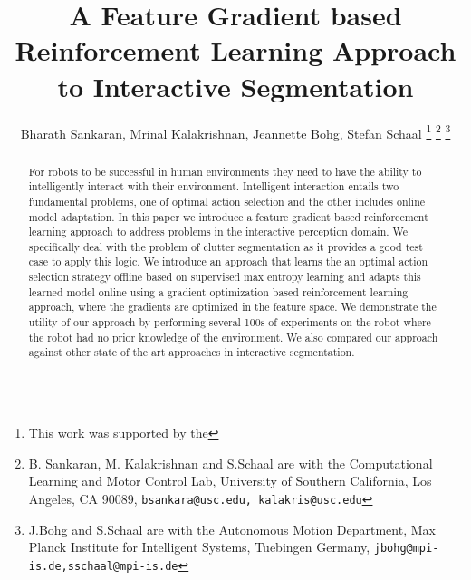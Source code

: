 \documentclass[letterpaper, 10pt, conference]{ieeeconf}
\begin{document}
\title{\LARGE \bf A Feature Gradient based Reinforcement Learning Approach to Interactive Segmentation}

\author{Bharath Sankaran, Mrinal Kalakrishnan, Jeannette Bohg, Stefan Schaal%
\thanks{This work was supported by the }%
\thanks{B. Sankaran, M. Kalakrishnan and S.Schaal are with the Computational Learning and Motor Control Lab, University of Southern California, Los Angeles, CA 90089, {\tt\small bsankara@usc.edu, kalakris@usc.edu}}%
\thanks{J.Bohg and S.Schaal are with the Autonomous Motion Department, Max Planck Institute for Intelligent Systems, Tuebingen Germany, {\tt\small jbohg@mpi-is.de,sschaal@mpi-is.de}}%
}
\maketitle


\begin{abstract}
For robots to be successful in human environments they need to have the ability to intelligently interact with their environment. Intelligent interaction entails two fundamental problems, one of optimal action selection and the other includes online model adaptation. 
In this paper we introduce a feature gradient based reinforcement learning approach to address problems in the interactive perception domain. We specifically deal with the problem of clutter segmentation as it provides a good test case to apply this logic. We introduce an approach that learns the an optimal action selection strategy offline based on 
supervised max entropy learning and adapts this learned model online using a gradient optimization based reinforcement learning approach, where the gradients are optimized in the feature space. We demonstrate the utility of our approach by performing several 100s of experiments on the robot where the robot had no prior knowledge of the environment.
We also compared our approach against other state of the art approaches in interactive segmentation.
\end{abstract}


\end{document}
